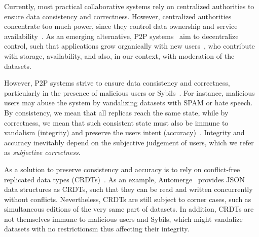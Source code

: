 \documentclass[12pt]{article}
\begin{document}
Currently, most practical collaborative systems rely on centralized authorities
to ensure data consistency and correctness.
However, centralized authorities concentrate too much power, since they control
data ownership and service availability~\cite{pincheira2022decentralized}.
As an emerging alternative, P2P systems~\cite{androutsellis2004survey} aim to
decentralize control, such that applications grow organically with new
users~\cite{rodrigues2010peer}, who contribute with storage, availability, and
also, in our context, with moderation of the datasets.

However, P2P systems strive to ensure data consistency and correctness,
particularly in the presence of malicious users or
Sybils~\cite{douceur2002sybil}.
For instance, malicious users may abuse the system by vandalizing datasets with
SPAM or hate speech.
By consistency, we mean that all replicas reach the same state, while by
correctness, we mean that such consistent state must also be immune to
vandalism (integrity) and preserve the users intent
(accuracy)~\cite{litt2022peritext}.
Integrity and accuracy inevitably depend on the subjective judgement of users,
which we refer as \emph{subjective correctness}.

As a solution to preserve consistency and accuracy is to rely on conflict-free
replicated data types (CRDTs)~\cite{shapiro2011conflict}.
As an example, Automerge~\cite{kleppmann2018automerge} provides JSON data
structures as CRDTs, such that they can be read and written concurrently
without conflicts.
Nevertheless, CRDTs are still subject to corner cases, such as simultaneous
editions of the very same part of datasets.
In addition, CRDTs are not themselves immune to malicious users and Sybils,
which might vandalize datasets with no restrictionsm thus affecting their
integrity.

\end{document}
